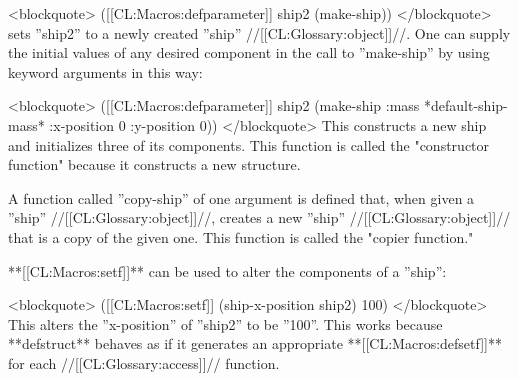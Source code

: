 <blockquote> ([[CL:Macros:defparameter]] ship2 (make-ship)) </blockquote> sets ''ship2'' to a newly created ''ship'' //[[CL:Glossary:object]]//. One can supply the initial values of any desired component in the call to ''make-ship'' by using keyword arguments in this way:

<blockquote> ([[CL:Macros:defparameter]] ship2 (make-ship :mass *default-ship-mass* :x-position 0 :y-position 0)) </blockquote> This constructs a new ship and initializes three of its components. This function is called the "constructor function" because it constructs a new structure.

 A function called ''copy-ship'' of one argument is defined that, when given a ''ship'' //[[CL:Glossary:object]]//, creates a new ''ship'' //[[CL:Glossary:object]]// that is a copy of the given one. This function is called the "copier function." \endlist

**[[CL:Macros:setf]]** can be used to alter the components of a ''ship'':

<blockquote> ([[CL:Macros:setf]] (ship-x-position ship2) 100) </blockquote> This alters the ''x-position'' of ''ship2'' to be ''100''. This works because **defstruct** behaves as if it generates an appropriate **[[CL:Macros:defsetf]]** for each //[[CL:Glossary:access]]// function.

